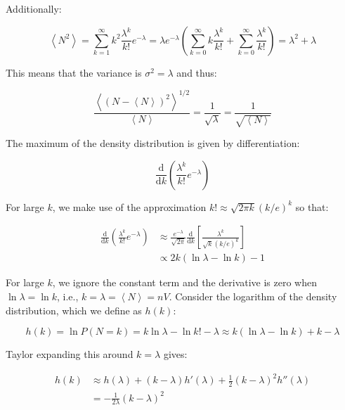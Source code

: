 \documentclass[12pt]{article}
\begin{document}
Additionally:

\begin{equation}
    \left\langle N^{2} \right\rangle = \sum_{k=1}^{\infty} k^{2} \frac{\lambda^{k}}{k!} e^{-\lambda} = \lambda e^{-\lambda} \left( \sum_{k=0}^{\infty} k \frac{\lambda^{k}}{k!} + \sum_{k=0}^{\infty} \frac{\lambda^{k}}{k!} \right) = \lambda^{2} + \lambda
\end{equation}

This means that the variance is $\sigma^{2} = \lambda$ and thus:

\begin{equation}
    \frac{\left\langle (N - \left\langle N \right\rangle)^{2} \right\rangle^{1/2}}{\left\langle N \right\rangle} = \frac{1}{\sqrt{\lambda}} = \frac{1}{\sqrt{\left\langle N \right\rangle}}
\end{equation}

The maximum of the density distribution is given by differentiation:

\begin{equation}
    \frac{\mathrm{d}}{\mathrm{d}k} \left( \frac{\lambda^{k}}{k!} e^{-\lambda} \right)
\end{equation}

For large $k$, we make use of the approximation $k! \approx \sqrt{2\pi k} (k/e)^{k}$ so that:

\begin{equation}
\begin{split}
    \frac{\mathrm{d}}{\mathrm{d}k} \left( \frac{\lambda^{k}}{k!} e^{-\lambda} \right) &\approx \frac{e^{-\lambda}}{\sqrt{2\pi}} \frac{\mathrm{d}}{\mathrm{d}k} \left[ \frac{\lambda^{k}}{\sqrt{k} (k/e)^{k}} \right] \\
    &\propto 2k (\ln{\lambda} - \ln{k}) - 1
\end{split}
\end{equation}

For large $k$, we ignore the constant term and the derivative is zero when $\ln{\lambda} = \ln{k}$, i.e., $k = \lambda = \left\langle N \right\rangle = nV$. Consider the logarithm of the density distribution, which we define as $h(k)$:

\begin{equation}
    h(k) = \ln{P(N = k)} = k \ln{\lambda} - \ln{k!} - \lambda \approx k (\ln{\lambda} - \ln{k}) + k - \lambda
\end{equation}

Taylor expanding this around $k = \lambda$ gives:

\begin{equation}
\begin{split}
    h(k) &\approx h(\lambda) + (k - \lambda) h'(\lambda) + \frac{1}{2} (k - \lambda)^{2} h''(\lambda) \\
    &= -\frac{1}{2\lambda} (k - \lambda)^{2}
\end{split}
\end{equation}
\end{document}
